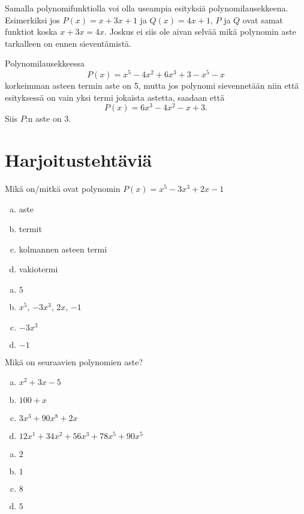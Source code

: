 Samalla polynomifunktiolla voi olla useampia esityksiä polynomilausekkeena.
Esimerkiksi jos $P(x) = x+3x+1$ ja $Q(x) = 4x+1$, $P$ ja $Q$ ovat samat
funktiot koska $x+3x = 4x$. Joskus ei siis ole aivan selvää mikä polynomin
aste tarkalleen on ennen sieventämistä.

\begin{esimerkki}
Polynomilausekkeessa
\[P(x) = x^5-4x^2+6x^3+3-x^5-x\]
korkeimman asteen termin aste on 5, mutta jos polynomi sievennetään niin että
esityksessä on vain yksi termi jokaista astetta, saadaan että
\[P(x) = 6x^3-4x^2-x+3.\]
Siis $P$:n aste on 3.
\end{esimerkki}


\section{Harjoitustehtäviä}

\begin{tehtava}
	Mikä on/mitkä ovat polynomin $P(x) = x^5-3x^3+2x-1$
	\begin{enumerate}[a)]
		\item aste
		\item termit
		\item kolmannen asteen termi
		\item vakiotermi
	\end{enumerate}

	\begin{vastaus}
		\begin{enumerate}[a)]
			\item $5$
			\item $x^5$, $-3x^3$, $2x$, $-1$
			\item $-3x^3$
			\item $-1$
		\end{enumerate}
	\end{vastaus}
\end{tehtava}

\begin{tehtava}
	Mikä on seuraavien polynomien aste?
	\begin{enumerate}[a)]
		\item $x^2 + 3x - 5$
		\item $100 + x$
		\item $3x^3 + 90x^8 + 2x$
		\item $12x^1 + 34x^2 + 56x^3 + 78x^5 + 90x^5$
	\end{enumerate}

	\begin{vastaus}
		\begin{enumerate}[a)]
			\item $2$
			\item $1$
			\item $8$
			\item $5$
		\end{enumerate}
	\end{vastaus}
\end{tehtava}

